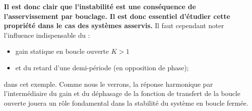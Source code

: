 \textbf{Il est donc clair que l'instabilité est une conséquence de 
l'asservissement par bouclage. Il est donc essentiel d'étudier 
cette propriété dans le cas des systèmes asservis.}
Il faut cependant noter l'influence indispensable du :
\begin{itemize}
    \item gain statique en boucle ouverte $K>1$
    \item et du retard d'une demi-période (en opposition de phase); 
\end{itemize}
dans cet exemple. Comme nous le verrons, la réponse harmonique par 
l'intermédiaire du gain et du déphasage de la fonction de transfert 
de la boucle ouverte jouera un rôle fondamental dans la stabilité du système
en boucle fermée.
